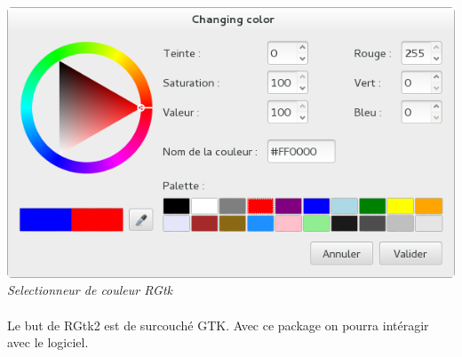 \begin{center}
\includegraphics[scale=0.4]{colorselector2.png}
\textit{Selectionneur de couleur RGtk}
\end{center}

\paragraph{}
Le but de RGtk2 est de surcouché GTK. Avec ce package on pourra intéragir avec le logiciel. \\
